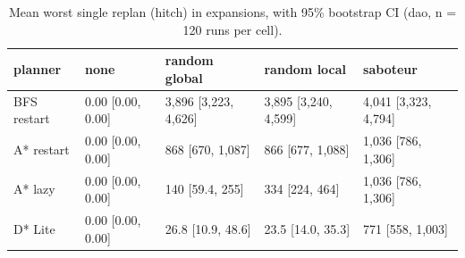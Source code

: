 \begin{table}[t]
\centering
\small
\caption{Mean worst single replan (hitch) in expansions, with 95\% bootstrap CI (dao, n = 120 runs per cell).}
\label{tab:hitch-dao}
\begin{tabular}{lllll}
\toprule
planner & none & random global & random local & saboteur \\
\midrule
BFS restart & 0.00 [0.00, 0.00] & 3,896 [3,223, 4,626] & 3,895 [3,240, 4,599] & 4,041 [3,323, 4,794] \\
A* restart & 0.00 [0.00, 0.00] & 868 [670, 1,087] & 866 [677, 1,088] & 1,036 [786, 1,306] \\
A* lazy & 0.00 [0.00, 0.00] & 140 [59.4, 255] & 334 [224, 464] & 1,036 [786, 1,306] \\
D* Lite & 0.00 [0.00, 0.00] & 26.8 [10.9, 48.6] & 23.5 [14.0, 35.3] & 771 [558, 1,003] \\
\bottomrule
\end{tabular}
\end{table}
